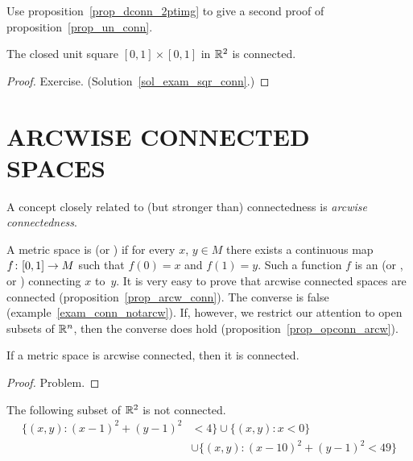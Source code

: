 \begin{prob} Use proposition~\ref{prop_dconn_2ptimg} to give a second proof of
proposition~\ref{prop_un_conn}.
\end{prob}

\begin{exam}\label{exam_sqr_conn} The closed unit square $[0,1] \times [0,1]$ in $\mathbb{R}^2$ is connected.
\end{exam}

\begin{proof} Exercise.   (Solution~\ref{sol_exam_sqr_conn}.)  \ns   \end{proof}








\section{ARCWISE CONNECTED SPACES}
A concept closely related to (but stronger than) connectedness is \emph{arcwise
connectedness}.

\begin{defn}  A metric space is
 (or
) if for every $x$, $y \in M$ there exists a continuous map $f \colon [0,1]
\rightarrow M$ such that $f(0) = x$ and $f(1) = y$. Such a function $f$ is an
 (or
 , or
) connecting $x$ to~$y$. It is very easy to prove that arcwise connected spaces are
connected (proposition~\ref{prop_arcw_conn}).  The converse is false
(example~\ref{exam_conn_notarcw}).  If, however, we restrict our attention to open subsets of
$\mathbb{R}^n$, then the converse does hold (proposition~\ref{prop_opconn_arcw}).
\end{defn}

\begin{prop}\label{prop_arcw_conn}  If a metric space is arcwise connected, then it is connected.
\end{prop}

\begin{proof} Problem.  \ns  \end{proof}

\begin{exam} The following subset of $\mathbb{R}^2$ is not connected.
\[ \begin{split}
     \{(x,y) \colon (x-1)^2 + (y-1)^2 &< 4\} \cup \{(x,y) \colon x < 0\} \\
                     &\cup  \{(x,y) \colon (x-10)^2 + (y-1)^2 < 49\}
   \end{split}\]
\end{exam}

